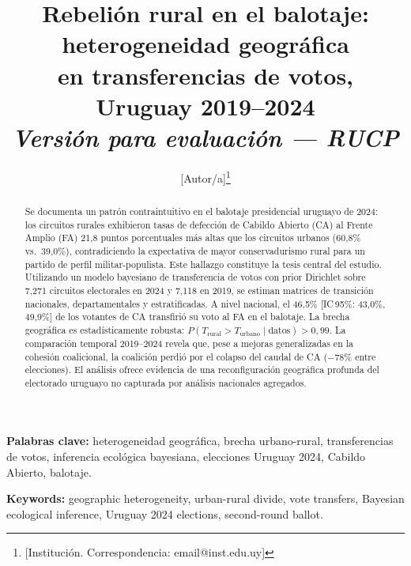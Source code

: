 \documentclass[12pt,a4paper]{article}
\title{%
    \textbf{Rebelión rural en el balotaje: heterogeneidad geográfica}\\
    \textbf{en transferencias de votos, Uruguay 2019--2024}\\[0.5em]
    {\normalsize \textit{Versión para evaluación — RUCP}}
}
\author{[Autor/a]\thanks{[Institución. Correspondencia: email@inst.edu.uy]}}
\date{}
\begin{document}

\maketitle

\begin{abstract}
\noindent
Se documenta un patrón contraintuitivo en el balotaje presidencial uruguayo de 2024: los circuitos rurales exhibieron tasas de defección de Cabildo Abierto (CA) al Frente Amplio (FA) 21{,}8 puntos porcentuales más altas que los circuitos urbanos (60{,}8\% vs.\ 39{,}0\%), contradiciendo la expectativa de mayor conservadurismo rural para un partido de perfil militar-populista. Este hallazgo constituye la tesis central del estudio. Utilizando un modelo bayesiano de transferencia de votos con prior Dirichlet sobre 7{,}271 circuitos electorales en 2024 y 7{,}118 en 2019, se estiman matrices de transición nacionales, departamentales y estratificadas. A nivel nacional, el 46{,}5\% [IC\,95\%: 43{,}0\%, 49{,}9\%] de los votantes de CA transfirió su voto al FA en el balotaje. La brecha geográfica es estadísticamente robusta: $P(T_{\text{rural}} > T_{\text{urbano}} \mid \text{datos}) > 0{,}99$. La comparación temporal 2019--2024 revela que, pese a mejoras generalizadas en la cohesión coalicional, la coalición perdió por el colapso del caudal de CA ($-$78\% entre elecciones). El análisis ofrece evidencia de una reconfiguración geográfica profunda del electorado uruguayo no capturada por análisis nacionales agregados.
\end{abstract}

\vspace{0.4cm}
\noindent\textbf{Palabras clave:} heterogeneidad geográfica, brecha urbano-rural, transferencias de votos, inferencia ecológica bayesiana, elecciones Uruguay 2024, Cabildo Abierto, balotaje.

\vspace{0.3cm}
\noindent\textbf{Keywords:} geographic heterogeneity, urban-rural divide, vote transfers, Bayesian ecological inference, Uruguay 2024 elections, second-round ballot.

\newpage
\tableofcontents
\newpage

\end{document}
